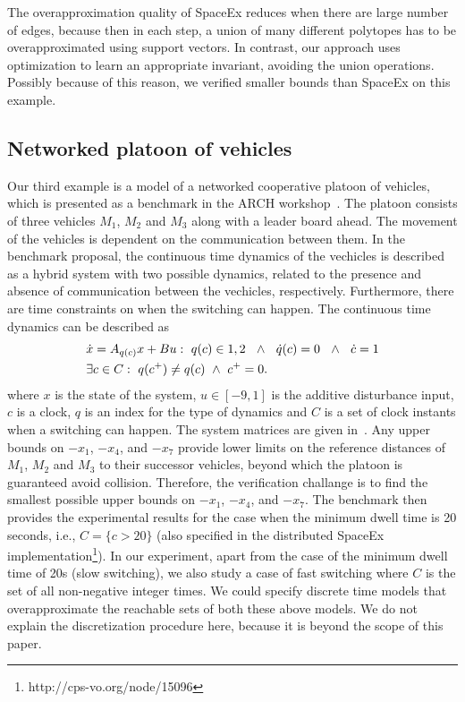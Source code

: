  The overapproximation quality of SpaceEx reduces when
there are large number of edges, because then in each step, a union of
many different polytopes has to be overapproximated using support
vectors.  In contrast, our approach uses optimization to learn an
appropriate invariant, avoiding the union operations.  Possibly
because of this reason, we verified smaller bounds than SpaceEx on
this example.

\subsection{Networked platoon of vehicles}
Our third example is a model of a networked cooperative platoon of
vehicles, which is presented as a benchmark in the ARCH
workshop~\cite{makhlouf2014networked}.  The platoon consists of three
vehicles $M_1$, $M_2$ and $M_3$ along with a leader board ahead.  The
movement of the vehicles is dependent on the communication between
them.  In the benchmark proposal, the continuous time dynamics of the
vechicles is described as a hybrid system with two possible dynamics,
related to the presence and absence of communication between the
vechicles, respectively.  Furthermore, there are time constraints on
when the switching can happen.  The continuous time dynamics can be
described as 
\vspace{-0.75em}
 \begin{align*} &\dot{x} = A_{q(c)}x+B
u:~q(c)\in{1,2}~~\wedge~~\dot{q}(c)=0~~\wedge~~\dot{c}=1\\ &\exists
c\in C:~q(c^+)\neq q(c)~\wedge~c^+=0.
\vspace{-2em}
\end{align*}
where $x$ is the state of the system, $u\in[-9,1]$ is the additive
disturbance input, $c$ is a clock, $q$ is an index
for the type of dynamics and $C$ is a set of clock instants when a
switching can happen.  The system matrices are given in~\cite{makhlouf2014networked}.
%
 Any upper bounds on $-x_1$, $-x_4$, and $-x_7$ provide lower limits
 on the reference distances of $M_1$, $M_2$ and $M_3$ to their
 successor vehicles, beyond which the platoon is guaranteed avoid
 collision.  Therefore, the verification challange is to find the
 smallest possible upper bounds on $-x_1$, $-x_4$, and $-x_7$.  The
 benchmark then provides the experimental results for the case when
 the minimum dwell time is 20 seconds, i.e., $C=\{c>20\}$ (also
 specified in the distributed SpaceEx
 implementation\footnote{http://cps-vo.org/node/15096}).  In our
 experiment, apart from the case of the minimum dwell time of 20s
 (slow switching), we also study a case of fast switching where $C$ is
 the set of all non-negative integer times.  We could specify discrete time
 models that overapproximate the reachable sets of both these above
 models.  We do not explain the discretization procedure here, because
 it is beyond the scope of this paper.

